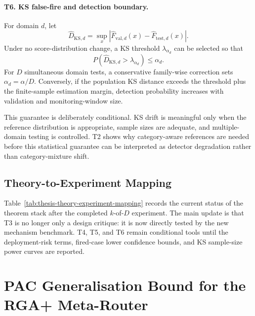 \documentclass[11pt]{article}
\begin{document}
\paragraph{T6. KS false-fire and detection boundary.}
For domain $d$, let
\[
  \widehat D_{\mathrm{KS},d}=
  \sup_x\left|
  \widehat F_{\mathrm{val},d}(x)-\widehat F_{\mathrm{test},d}(x)
  \right|.
\]
Under no score-distribution change, a KS threshold $\lambda_{\alpha_d}$ can be
selected so that
\[
  P(\widehat D_{\mathrm{KS},d}>\lambda_{\alpha_d})\leq\alpha_d.
\]
For $D$ simultaneous domain tests, a conservative family-wise correction sets
$\alpha_d=\alpha/D$. Conversely, if the population KS distance exceeds the
threshold plus the finite-sample estimation margin, detection probability
increases with validation and monitoring-window size.

This guarantee is deliberately conditional. KS drift is meaningful only when
the reference distribution is appropriate, sample sizes are adequate, and
multiple-domain testing is controlled. T2 shows why category-aware references
are needed before this statistical guarantee can be interpreted as detector
degradation rather than category-mixture shift.

\subsection{Theory-to-Experiment Mapping}

Table~\ref{tab:thesis-theory-experiment-mapping} records the current status of
the theorem stack after the completed $k$-of-$D$ experiment. The main update is
that T3 is no longer only a design critique: it is now directly tested by the
new mechanism benchmark. T4, T5, and T6 remain conditional tools until the
deployment-risk terms, fired-case lower confidence bounds, and KS sample-size
power curves are reported.

\begin{table}[H]
\centering
\caption{Theory-to-experiment mapping after the completed $k$-of-$D$ run.}
\label{tab:thesis-theory-experiment-mapping}
\scriptsize
\resizebox{\textwidth}{!}{}
\end{table}

\section{PAC Generalisation Bound for the RGA+ Meta-Router}
\label{app:pac-router}
\end{document}
